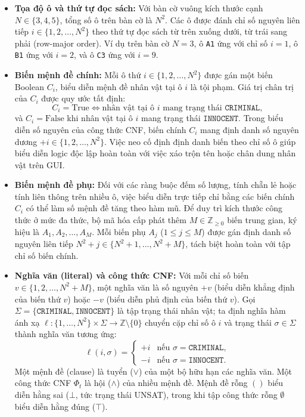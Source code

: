 \begin{itemize}
    \item \textbf{Tọa độ ô và thứ tự đọc sách:} Với bàn cờ vuông kích thước cạnh $N \in \{3, 4, 5\}$, tổng số ô trên bàn cờ là $N^2$. Các ô được đánh chỉ số nguyên liên tiếp $i \in \{1, 2, \dots, N^2\}$ theo thứ tự đọc sách từ trên xuống dưới, từ trái sang phải (row-major order). Ví dụ trên bàn cờ $N = 3$, ô \texttt{A1} ứng với chỉ số $i = 1$, ô \texttt{B1} ứng với $i = 2$, và ô \texttt{C3} ứng với $i = 9$.

    \item \textbf{Biến mệnh đề chính:} Mỗi ô thứ $i \in \{1, 2, \dots, N^2\}$ được gán một biến Boolean $C_i$, biểu diễn mệnh đề nhân vật tại ô $i$ là tội phạm. Giá trị chân trị của $C_i$ được quy ước tất định:
    \begin{equation}
        C_i = \text{True} \iff \text{nhân vật tại ô } i \text{ mang trạng thái } \texttt{CRIMINAL},
    \end{equation}
    và $C_i = \text{False}$ khi nhân vật tại ô $i$ mang trạng thái $\texttt{INNOCENT}$. Trong biểu diễn số nguyên của công thức CNF, biến chính $C_i$ mang định danh số nguyên dương $+i \in \{1, 2, \dots, N^2\}$. Việc neo cố định định danh biến theo chỉ số ô giúp biểu diễn logic độc lập hoàn toàn với việc xáo trộn tên hoặc chân dung nhân vật trên GUI.

    \item \textbf{Biến mệnh đề phụ:} Đối với các ràng buộc đếm số lượng, tính chẵn lẻ hoặc tính liên thông trên nhiều ô, việc biểu diễn trực tiếp chỉ bằng các biến chính $C_i$ có thể làm số mệnh đề tăng theo hàm mũ. Để duy trì kích thước công thức ở mức đa thức, bộ mã hóa cấp phát thêm $M \in \mathbb{Z}_{\ge 0}$ biến trung gian, ký hiệu là $A_1, A_2, \dots, A_M$. Mỗi biến phụ $A_j$ ($1 \le j \le M$) được gán định danh số nguyên liên tiếp $N^2 + j \in \{N^2 + 1, \dots, N^2 + M\}$, tách biệt hoàn toàn với tập chỉ số biến chính.

    \item \textbf{Nghĩa văn (literal) và công thức CNF:} Với mỗi chỉ số biến $v \in \{1, 2, \dots, N^2 + M\}$, một nghĩa văn là số nguyên $+v$ (biểu diễn khẳng định của biến thứ $v$) hoặc $-v$ (biểu diễn phủ định của biến thứ $v$). Gọi $\Sigma = \{\texttt{CRIMINAL}, \texttt{INNOCENT}\}$ là tập trạng thái nhân vật; ta định nghĩa hàm ánh xạ $\ell: \{1, \dots, N^2\} \times \Sigma \to \mathbb{Z} \setminus \{0\}$ chuyển cặp chỉ số ô $i$ và trạng thái $\sigma \in \Sigma$ thành nghĩa văn tương ứng:
    \begin{equation}
        \ell(i, \sigma) = \begin{cases}
            +i & \text{nếu } \sigma = \texttt{CRIMINAL}, \\
            -i & \text{nếu } \sigma = \texttt{INNOCENT}.
        \end{cases}
    \end{equation}
    Một mệnh đề (clause) là tuyển ($\lor$) của một bộ hữu hạn các nghĩa văn. Một công thức CNF $\Phi_t$ là hội ($\land$) của nhiều mệnh đề. Mệnh đề rỗng $()$ biểu diễn hằng sai ($\bot$, tức trạng thái UNSAT), trong khi tập công thức rỗng $\emptyset$ biểu diễn hằng đúng ($\top$).
\end{itemize}

